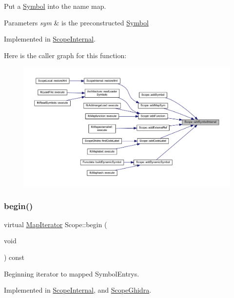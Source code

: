 Put a \mbox{\hyperlink{class_symbol}{Symbol}} into the name map. 


\begin{DoxyParams}{Parameters}
{\em sym} & is the preconstructed \mbox{\hyperlink{class_symbol}{Symbol}} \\
\hline
\end{DoxyParams}


Implemented in \mbox{\hyperlink{class_scope_internal_af252bcb614abeea3af1750442087304a}{Scope\+Internal}}.

Here is the caller graph for this function\+:
\nopagebreak
\begin{figure}[H]
\begin{center}
\leavevmode
\includegraphics[width=350pt]{class_scope_a66d3198f4bd28cf9e8a2a6bc00d065d8_icgraph}
\end{center}
\end{figure}
\mbox{\label{class_scope_a054e7b7c470035be94e1e4229ff188d4}} 
\subsubsection{\texorpdfstring{begin()}{begin()}}
{\footnotesize\ttfamily virtual \mbox{\hyperlink{class_map_iterator}{Map\+Iterator}} Scope\+::begin (\begin{DoxyParamCaption}\item[{void}]{ }\end{DoxyParamCaption}) const\hspace{0.3cm}{\ttfamily [pure virtual]}}



Beginning iterator to mapped Symbol\+Entrys. 



Implemented in \mbox{\hyperlink{class_scope_internal_ace6700a82166765cf943bb95f1efeb10}{Scope\+Internal}}, and \mbox{\hyperlink{class_scope_ghidra_ad17a63dadd4390989eaf9f20b8cbf173}{Scope\+Ghidra}}.

